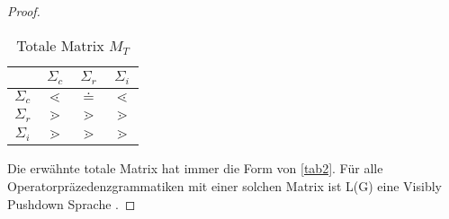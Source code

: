 \begin{proof}
\begin{table}
\begin{center}
\begin{tabular}[c]{c | c | c | c }
	&	$\Sigma_c$ & $\Sigma_r$ & $\Sigma_i$ \\ \hline
$\Sigma_c$ & $\lessdot$ 	& $\doteq$	& $\lessdot$	\\ \hline
$\Sigma_r$ & $\gtrdot$	&$\gtrdot$		&$\gtrdot$		\\ \hline
$\Sigma_i$	&$\gtrdot$		&$\gtrdot$		&$\gtrdot$		\\
\end{tabular}
\caption{Totale Matrix $M_T$}
\label{tab2}
\end{center}
\end{table}
Die erwähnte totale Matrix hat immer die Form von \autoref{tab2}. Für alle Operatorpräzedenzgrammatiken mit einer solchen Matrix ist L(G) eine Visibly Pushdown Sprache \cite{op_vpl_property}.
\end{proof}
